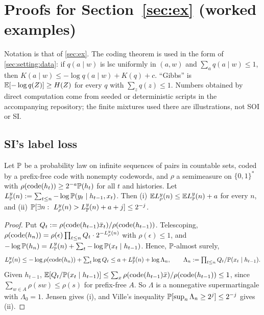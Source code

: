 \section{Proofs for Section~\ref{sec:ex} (worked examples)}\label{app:ex}

Notation is that of \cref{sec:ex}. The coding theorem is used in the form of \cref{sec:setting:data}: if $q(a\mid w)$ is lsc uniformly in $(a,w)$ and $\sum_aq(a\mid w)\le1$, then $K(a\mid w)\le-\log q(a\mid w)+K(q)+c$. ``Gibbs'' is $\mathbb{E}[-\log q(Z)]\ge H(Z)$ for every $q$ with $\sum_zq(z)\le1$. Numbers obtained by direct computation come from seeded or deterministic scripts in the accompanying repository; the finite mixtures used there are illustrations, not SOI or SI.

\subsection{SI's label loss}\label{app:ex:tools}

\begin{lemma}\label{lem:ex:silabel}
Let $\mathbb{P}$ be a probability law on infinite sequences of pairs in countable sets, coded by a prefix-free code with nonempty codewords, and $\rho$ a semimeasure on $\{0,1\}^*$ with $\rho(\operatorname{code}(h_t))\ge2^{-a}\mathbb{P}(h_t)$ for all $t$ and histories. Let $L^y_{\mathbb{P}}(n):=\sum_{t\le n}-\log\mathbb{P}(y_t\mid h_{t-1},x_t)$. Then (i) $\mathbb{E} L^y_\rho(n)\le\mathbb{E} L^y_{\mathbb{P}}(n)+a$ for every $n$, and (ii) $\Prob[\exists n:\ L^y_\rho(n)>L^y_\Prob(n)+a+j]\le2^{-j}$.
\end{lemma}

\begin{proof}
Put $Q_t:=\rho(\operatorname{code}(h_{t-1})\bar x_t)/\rho(\operatorname{code}(h_{t-1}))$. Telescoping, $\rho(\operatorname{code}(h_n))=\rho(\epsilon)\prod_{t\le n}Q_t\cdot2^{-L^y_\rho(n)}$ with $\rho(\epsilon)\le1$, and $-\log\mathbb{P}(h_n)=L^y_{\mathbb{P}}(n)+\sum_t-\log\mathbb{P}(x_t\mid h_{t-1})$. Hence, $\mathbb{P}$-almost surely,
\[L^y_\rho(n)\le-\log\rho(\operatorname{code}(h_n))+\textstyle\sum_t\log Q_t\le a+L^y_{\mathbb{P}}(n)+\log\Lambda_n,\qquad \Lambda_n:=\prod_{t\le n}Q_t/\mathbb{P}(x_t\mid h_{t-1}).\]
Given $h_{t-1}$, $\mathbb{E}[Q_t/\mathbb{P}(x_t\mid h_{t-1})]\le\sum_x\rho(\operatorname{code}(h_{t-1})\bar x)/\rho(\operatorname{code}(h_{t-1}))\le1$, since $\sum_{w\in A}\rho(sw)\le\rho(s)$ for prefix-free $A$. So $\Lambda$ is a nonnegative supermartingale with $\Lambda_0=1$. Jensen gives (i), and Ville's inequality $\mathbb{P}[\sup_n\Lambda_n\ge2^j]\le2^{-j}$ \citep{ville1939etude} gives (ii).
\end{proof}

